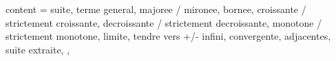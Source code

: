 {
  content = {
     suite,
     terme general, 
     majoree / mironee,
     bornee, 
     croissante /  strictement croissante, 
     decroissante / strictement decroissante, 
     monotone / strictement monotone,
     limite, 
     tendre vers +/- infini, 
     convergente, 
     adjacentes, 
     suite extraite,
  },
}
\endinput
bla blab \bla